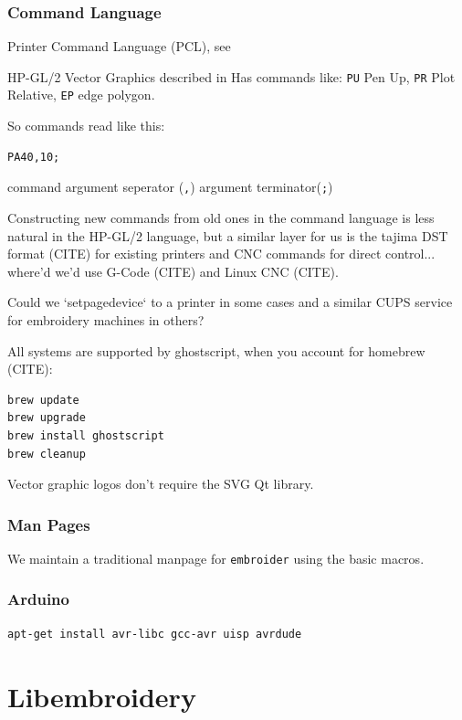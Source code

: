\documentclass[11pt]{report}
\begin{document}
\subsection{Command Language}

Printer Command Language (PCL), see %

HP-GL/2 Vector Graphics  described in %
Has commands like: \texttt{PU} Pen Up, \texttt{PR} Plot Relative,
\texttt{EP} edge polygon.

So commands read like this:

\begin{lstlisting}
PA40,10;
\end{lstlisting}

command argument seperator (\texttt{,}) argument terminator(\texttt{;})

Constructing new commands from old ones in the command language is less
natural in the HP-GL/2 language, but a similar layer for us is
the tajima DST format (CITE) for existing printers and CNC commands for
direct control... where'd we'd use G-Code (CITE) and Linux CNC (CITE).

Could we `setpagedevice` to a printer in some cases and a similar CUPS service
for embroidery machines in others?

All systems are supported by ghostscript, when you account for homebrew (CITE):

\begin{lstlisting}
brew update
brew upgrade
brew install ghostscript
brew cleanup
\end{lstlisting}

Vector graphic logos don't require the SVG Qt library.

\subsection{Man Pages}

We maintain a traditional manpage for \texttt{embroider} using
the basic macros.

\subsection{Arduino}

\begin{lstlisting}
apt-get install avr-libc gcc-avr uisp avrdude
\end{lstlisting}

\chapter{Libembroidery}
\end{document}

